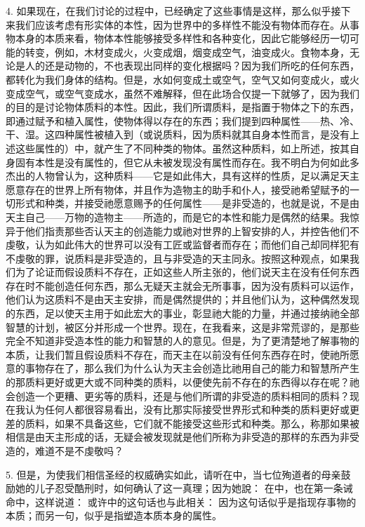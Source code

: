 4. 如果现在，在我们讨论的过程中，已经确定了这些事情是这样，那么似乎接下来我们应该考虑有形实体的本性，因为世界中的多样性不能没有物体而存在。从事物本身的本质来看，物体本性能够接受多样性和各种变化，因此它能够经历一切可能的转变，例如，木材变成火，火变成烟，烟变成空气，油变成火。食物本身，无论是人的还是动物的，不也表现出同样的变化根据吗？因为我们所吃的任何东西，都转化为我们身体的结构。但是，水如何变成土或空气，空气又如何变成火，或火变成空气，或空气变成水，虽然不难解释，但在此场合仅提一下就够了，因为我们的目的是讨论物体质料的本性。因此，我们所谓质料，是指置于物体之下的东西，即通过赋予和植入属性，使物体得以存在的东西；我们提到四种属性——热、冷、干、湿。这四种属性被植入到（或说质料，因为质料就其自身本性而言，是没有上述这些属性的）中，就产生了不同种类的物体。虽然这种质料，如上所述，按其自身固有本性是没有属性的，但它从未被发现没有属性而存在。我不明白为何如此多杰出的人物曾认为，这种质料——它是如此伟大，具有这样的性质，足以满足天主愿意存在的世界上所有物体，并且作为造物主的助手和仆人，接受祂希望赋予的一切形式和种类，并接受祂愿意赐予的任何属性——是非受造的，也就是说，不是由天主自己——万物的造物主——所造的，而是它的本性和能力是偶然的结果。我惊异于他们指责那些否认天主的创造能力或祂对世界的上智安排的人，并控告他们不虔敬，认为如此伟大的世界可以没有工匠或监督者而存在；而他们自己却同样犯有不虔敬的罪，说质料是非受造的，且与非受造的天主同永。按照这种观点，如果我们为了论证而假设质料不存在，正如这些人所主张的，他们说天主在没有任何东西存在时不能创造任何东西，那么无疑天主就会无所事事，因为没有质料可以运作，他们认为这质料不是由天主安排，而是偶然提供的；并且他们认为，这种偶然发现的东西，足以使天主用于如此宏大的事业，彰显祂大能的力量，并通过接纳祂全部智慧的计划，被区分并形成一个世界。现在，在我看来，这是非常荒谬的，是那些完全不知道非受造本性的能力和智慧的人的意见。但是，为了更清楚地了解事物的本质，让我们暂且假设质料不存在，而天主在以前没有任何东西存在时，使祂所愿意的事物存在了，那么我们为什么认为天主会创造比祂用自己的能力和智慧所产生的那质料更好或更大或不同种类的质料，以便使先前不存在的东西得以存在呢？祂会创造一个更糟、更劣等的质料，还是与他们所谓的非受造的质料相同的质料？现在我认为任何人都很容易看出，没有比那实际接受世界形式和种类的质料更好或更差的质料，如果不具备这些，它们就不能接受这些形式和种类。那么，称那如果被相信是由天主形成的话，无疑会被发现就是他们所称为非受造的那样的东西为非受造的，难道不是不虔敬吗？\par

5. 但是，为使我们相信圣经的权威确实如此，请听在中，当七位殉道者的母亲鼓励她的儿子忍受酷刑时，如何确认了这一真理；因为她說： 在中，也在第一条诫命中，这样说道： 或许中的这句话也与此相关： 因为这句话似乎是指现存事物的本质；而另一句，似乎是指塑造本质本身的属性。\par

